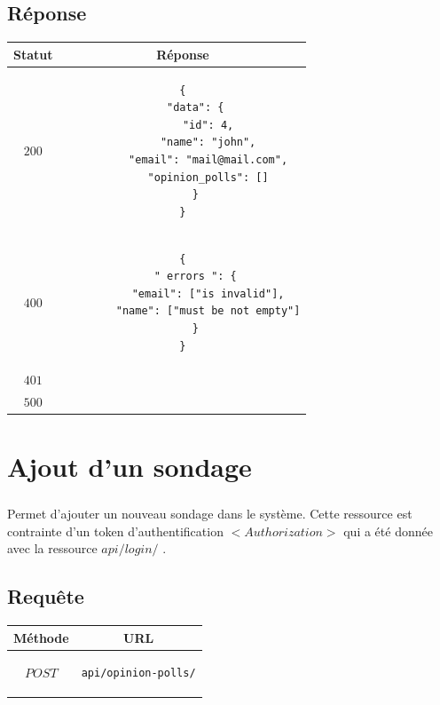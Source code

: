 \documentclass[titlepage]{report}
\begin{document}
\section{Réponse}

\begin{center}
	\begin{tabular}{|c|c|}
		\hline
		Statut & Réponse \\
		\hline
		$ 200 $ & \begin{lstlisting}
{
	"data": {
		"id": 4,
		"name": "john",
		"email": "mail@mail.com",
		"opinion_polls": []
	}
}
		\end{lstlisting} \\ 
		\hline
		$ 400 $ & \begin{lstlisting}
{
	" errors ": {
		"email": ["is invalid"],
		"name": ["must be not empty"]
	}
}
		\end{lstlisting} \\
		\hline
		$ 401 $ & \\
		\hline
		$ 500 $ & \\
		\hline
	\end{tabular}
\end{center}


\chapter{Ajout d'un sondage}

\paragraph{} Permet d’ajouter un nouveau sondage dans le système. Cette ressource est contrainte d’un token d'authentification $<Authorization>$ qui a été donnée avec la ressource $api/login/$ .

\section{Requête}

\begin{center}
	\begin{tabular}{|c|c|}
		\hline
		Méthode & URL \\
		\hline
		$ POST $ 
		&
		\begin{lstlisting}
api/opinion-polls/
		\end{lstlisting} 
		\\ \hline
	\end{tabular}
\end{center}
\end{document}
